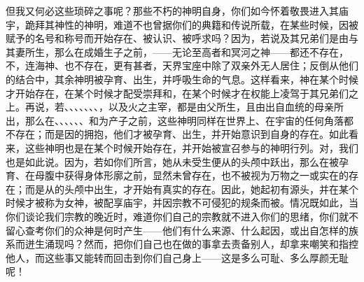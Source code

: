 但我又何必这些琐碎之事呢？那些不朽的神明自身，你们如今怀着敬畏进入其庙宇，跪拜其神性的神明，难道不也曾据你们的典籍和传说所载，在某些时候，因被赋予的名号和称号而开始存在、被认识、被呼求吗？因为，若说及其兄弟们是由与其妻所生，那么在成婚生子之前，——无论至高者和冥河之神——都还不存在，不，连海神、也不存在，更有甚者，天界宝座中除了双亲外无人居住；反倒从他们的结合中，其余神明被孕育、出生，并呼吸生命的气息。这样看来，神在某个时候才开始存在，在某个时候才配受崇拜和，在某个时候才在权能上凌驾于其兄弟们之上。再说，若、、、、、、、，以及火之主宰，都是由父所生，且由出自血统的母亲所出，那么在、、、、、、和为产子之前，这些神明同样在世界上、在宇宙的任何角落都不存在；而是因的拥抱，他们才被孕育、出生，并开始意识到自身的存在。如此看来，这些神明也是在某个时候开始存在，并开始被宣召参与的神明行列。对，我们也是如此说。因为，若如你们所言，她从未受生便从的头颅中跃出，那么在被孕育、在母腹中获得身体形廓之前，显然未曾存在，也不被视为万物之一或实在的存在；而是从的头颅中出生，才开始有真实的存在。因此，她起初有源头，并在某个时候才被称为女神，被配享庙宇，并因宗教不可侵犯的规条而被。情况既如此，当你们谈论我们宗教的晚近时，难道你们自己的宗教就不进入你们的思绪，你们就不留心查考你们的众神是何时产生——他们有什么来源、什么起因，或出自怎样的族系而迸生涌现吗？然而，把你们自己也在做的事拿去责备别人，却拿来嘲笑和指控他人，而这些事又能转而回击到你们自己身上——这是多么可耻、多么厚颜无耻呢！\par

